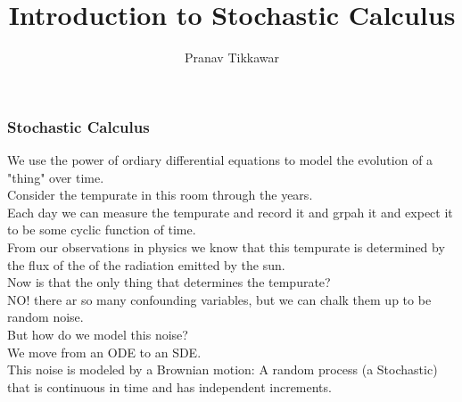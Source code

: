 \documentclass{beamer}
\author{Pranav Tikkawar}
\title{Introduction to Stochastic Calculus}
\begin{document}
\begin{frame}
    \frametitle{Stochastic Calculus}
    \titlepage
\end{frame}






We use the power of ordiary differential equations to model the evolution of a "thing" over time.\\
Consider the tempurate in this room through the years. \\
Each day we can measure the tempurate and record it and grpah it and expect it to be some cyclic function of time. \\
From our observations in physics we know that this tempurate is determined by the flux of the of the radiation emitted by the sun.\\
Now is that the only thing that determines the tempurate?\\
NO! there ar so many confounding variables, but we can chalk them up to be random noise.\\
But how do we model this noise?\\
We move from an ODE to an SDE. \\
This noise is modeled by a Brownian motion: A random process (a Stochastic) that is continuous in time and has independent increments.\\
\end{document}
